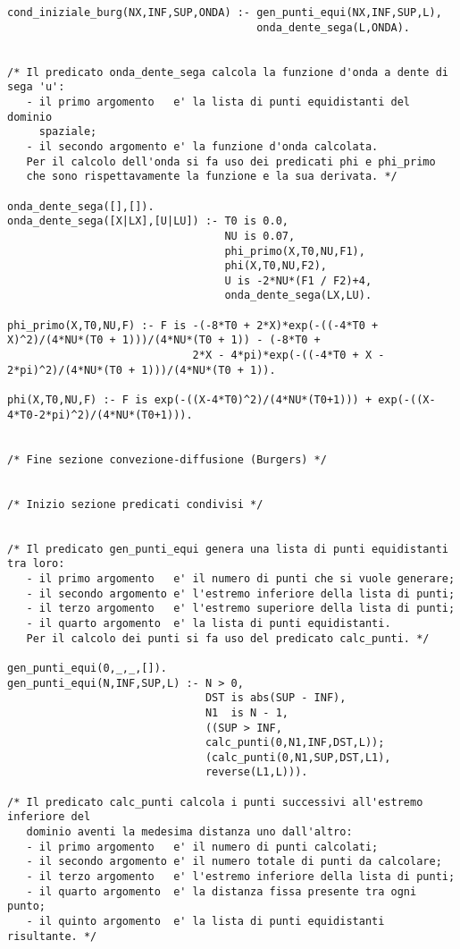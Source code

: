 \begin{verbatim}
cond_iniziale_burg(NX,INF,SUP,ONDA) :- gen_punti_equi(NX,INF,SUP,L),
                                       onda_dente_sega(L,ONDA).


/* Il predicato onda_dente_sega calcola la funzione d'onda a dente di sega 'u':
   - il primo argomento   e' la lista di punti equidistanti del dominio
     spaziale;
   - il secondo argomento e' la funzione d'onda calcolata. 
   Per il calcolo dell'onda si fa uso dei predicati phi e phi_primo
   che sono rispettavamente la funzione e la sua derivata. */

onda_dente_sega([],[]).
onda_dente_sega([X|LX],[U|LU]) :- T0 is 0.0,
                                  NU is 0.07,
                                  phi_primo(X,T0,NU,F1),
                                  phi(X,T0,NU,F2),
                                  U is -2*NU*(F1 / F2)+4,
                                  onda_dente_sega(LX,LU).

phi_primo(X,T0,NU,F) :- F is -(-8*T0 + 2*X)*exp(-((-4*T0 + X)^2)/(4*NU*(T0 + 1)))/(4*NU*(T0 + 1)) - (-8*T0 +
                             2*X - 4*pi)*exp(-((-4*T0 + X - 2*pi)^2)/(4*NU*(T0 + 1)))/(4*NU*(T0 + 1)).

phi(X,T0,NU,F) :- F is exp(-((X-4*T0)^2)/(4*NU*(T0+1))) + exp(-((X-4*T0-2*pi)^2)/(4*NU*(T0+1))).


/* Fine sezione convezione-diffusione (Burgers) */


/* Inizio sezione predicati condivisi */


/* Il predicato gen_punti_equi genera una lista di punti equidistanti tra loro:
   - il primo argomento   e' il numero di punti che si vuole generare;
   - il secondo argomento e' l'estremo inferiore della lista di punti;
   - il terzo argomento   e' l'estremo superiore della lista di punti;
   - il quarto argomento  e' la lista di punti equidistanti. 
   Per il calcolo dei punti si fa uso del predicato calc_punti. */

gen_punti_equi(0,_,_,[]).
gen_punti_equi(N,INF,SUP,L) :- N > 0,
                               DST is abs(SUP - INF),
                               N1  is N - 1,
                               ((SUP > INF,
                               calc_punti(0,N1,INF,DST,L));
                               (calc_punti(0,N1,SUP,DST,L1),
                               reverse(L1,L))).

/* Il predicato calc_punti calcola i punti successivi all'estremo inferiore del 
   dominio aventi la medesima distanza uno dall'altro:
   - il primo argomento   e' il numero di punti calcolati;
   - il secondo argomento e' il numero totale di punti da calcolare;
   - il terzo argomento   e' l'estremo inferiore della lista di punti;
   - il quarto argomento  e' la distanza fissa presente tra ogni punto;
   - il quinto argomento  e' la lista di punti equidistanti risultante. */
   

\end{verbatim}
